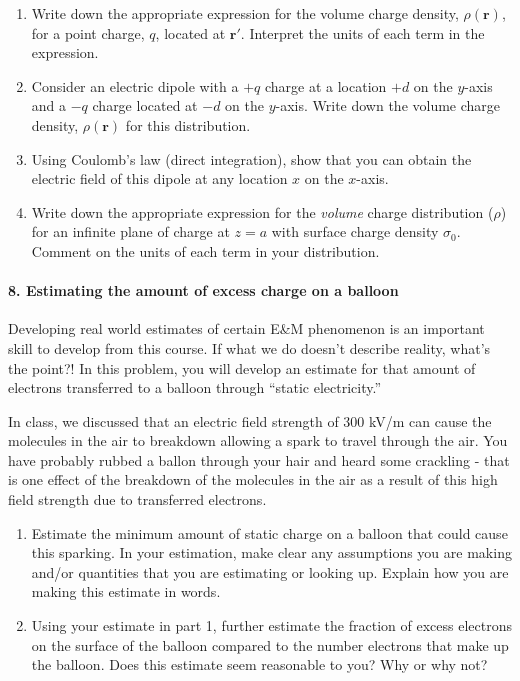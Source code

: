 \documentclass[11pt]{article}
\def\tightlist{}
\begin{document}
\begin{enumerate}
\def\labelenumi{\arabic{enumi}.}
\tightlist
\item
  Write down the appropriate expression for the volume charge density,
  \(\rho(\mathbf{r})\), for a point charge, \(q\), located at
  \(\mathbf{r}'\). Interpret the units of each term in the expression.
\item
  Consider an electric dipole with a \(+q\) charge at a location \(+d\)
  on the \(y\)-axis and a \(-q\) charge located at \(-d\) on the
  \(y\)-axis. Write down the volume charge density, \(\rho(\mathbf{r})\)
  for this distribution.
\item
  Using Coulomb's law (direct integration), show that you can obtain the
  electric field of this dipole at any location \(x\) on the \(x\)-axis.
\item
  Write down the appropriate expression for the \emph{volume} charge
  distribution (\(\rho\)) for an infinite plane of charge at \(z = a\)
  with surface charge density \(\sigma_0\). Comment on the units of each
  term in your distribution.
\end{enumerate}

\paragraph{8. Estimating the amount of excess charge on a
balloon}\label{estimating-the-amount-of-excess-charge-on-a-balloon}

Developing real world estimates of certain E\&M phenomenon is an
important skill to develop from this course. If what we do doesn't
describe reality, what's the point?! In this problem, you will develop
an estimate for that amount of electrons transferred to a balloon
through ``static electricity.''

In class, we discussed that an electric field strength of 300 kV/m can
cause the molecules in the air to breakdown allowing a spark to travel
through the air. You have probably rubbed a ballon through your hair and
heard some crackling - that is one effect of the breakdown of the
molecules in the air as a result of this high field strength due to
transferred electrons.

\begin{enumerate}
\def\labelenumi{\arabic{enumi}.}
\tightlist
\item
  Estimate the minimum amount of static charge on a balloon that could
  cause this sparking. In your estimation, make clear any assumptions
  you are making and/or quantities that you are estimating or looking
  up. Explain how you are making this estimate in words.
\item
  Using your estimate in part 1, further estimate the fraction of excess
  electrons on the surface of the balloon compared to the number
  electrons that make up the balloon. Does this estimate seem reasonable
  to you? Why or why not?
\end{enumerate}
\end{document}
